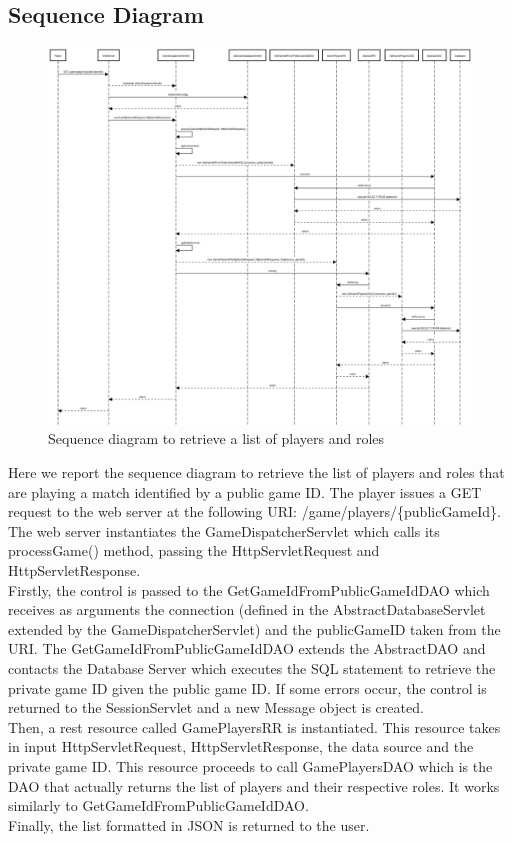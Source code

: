 \subsection{Sequence Diagram}
\begin{figure}[h]
\caption{Sequence diagram to retrieve a list of players and roles}
\includegraphics[scale=0.2]{images/seq_dia.png}
\end{figure}

Here we report the sequence diagram to retrieve the list of players and roles that are playing a match identified by a public game ID. The player issues a GET request to the web server at the following URI: /game/players/\{publicGameId\}. The web server instantiates the GameDispatcherServlet which calls its processGame() method, passing the HttpServletRequest and HttpServletResponse. \\
Firstly, the control is passed to the GetGameIdFromPublicGameIdDAO which receives as arguments the connection (defined in the AbstractDatabaseServlet extended by the GameDispatcherServlet) and the publicGameID taken from the URI. The GetGameIdFromPublicGameIdDAO extends the AbstractDAO and contacts the Database Server which executes the SQL statement to retrieve the private game ID given the public game ID. If some errors occur, the control is returned to the SessionServlet and a new Message object is created. \\
Then, a rest resource called GamePlayersRR is instantiated. This resource takes in input HttpServletRequest, HttpServletResponse, the data source and the private game ID. This resource proceeds to call GamePlayersDAO which is the DAO that actually returns the list of players and their respective roles. It works similarly to GetGameIdFromPublicGameIdDAO. \\
Finally, the list formatted in JSON is returned to the user.